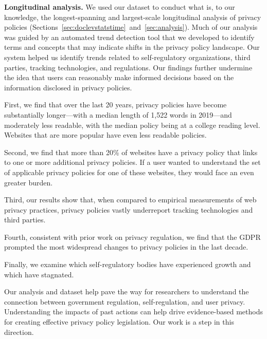 \textbf{Longitudinal analysis.} We used our dataset to conduct what is, to our knowledge, the longest-spanning and largest-scale longitudinal analysis of privacy policies (Sections~\ref{sec:doclevstatstime}~and~\ref{sec:analysis}).
Much of our analysis was guided by an automated trend detection tool that we developed to identify terms and concepts that may indicate shifts in the privacy policy landscape. Our system helped us identify trends related to self-regulatory organizations, third parties, tracking technologies, and regulations.
Our findings further undermine the idea that users can reasonably make informed decisions based on the information disclosed in privacy policies.

First, we find that over the last 20 years, privacy policies have become substantially longer---with a median length of 1,522 words in 2019---and moderately less readable, with the median policy being at a college reading level. Websites that are more popular have even less readable policies.

Second, we find that more than 20\% of websites have a privacy policy that links to one or more additional privacy policies. If a user wanted to understand the set of applicable privacy policies for one of these websites, they would face an even greater burden.


Third, our results show that, when compared to empirical measurements of web privacy practices, privacy policies vastly underreport tracking technologies and third parties.

Fourth, consistent with prior work on privacy regulation, we find that the GDPR prompted the most widespread changes to privacy policies in the last decade.

Finally, we examine which self-regulatory bodies have experienced growth and which have stagnated.

Our analysis and dataset help pave the way for researchers to understand the connection between government regulation, self-regulation, and user privacy. Understanding the impacts of past actions can help drive evidence-based methods for creating effective privacy policy legislation. Our work is a step in this direction.


